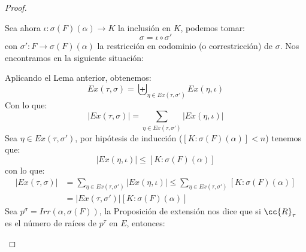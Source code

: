 \begin{prop}
\begin{proof}
\begin{itemize}
                Sea ahora $\iota:\sigma(F)(\alpha)\to K$ la inclusión en $K$, podemos tomar:
                \begin{equation*}
                    \sigma = \iota \circ \sigma'
                \end{equation*}
                con $\sigma':F\to \sigma(F)(\alpha)$ la restricción en codominio (o correstricción) de $\sigma$. Nos encontramos en la siguiente situación:
                \begin{figure}[H]
                    \centering
                \end{figure}
                \noindent
                Aplicando el Lema anterior, obtenemos:
                \begin{equation*}
                    Ex(\tau,\sigma) = \biguplus_{\eta \in Ex(\tau,\sigma')}Ex(\eta, \iota)
                \end{equation*}
                Con lo que:
                \begin{equation*}
                    |Ex(\tau,\sigma)| = \sum_{\eta \in  Ex(\tau, \sigma')}|Ex(\eta,\iota)|
                \end{equation*}
                Sea $\eta\in Ex(\tau,\sigma')$, por hipótesis de inducción ($[K:\sigma(F)(\alpha)]<n$) tenemos que:
                \begin{equation*}
                    |Ex(\eta,\iota)| \leq [K:\sigma(F)(\alpha)]
                \end{equation*}
                con lo que:
                \begin{align*}
                    |Ex(\tau,\sigma)| &= \sum_{\eta\in Ex(\tau,\sigma')}|Ex(\eta,\iota)| \leq \sum_{\eta\in Ex(\tau,\sigma')}[K:\sigma(F)(\alpha)] \\
                                      &= |Ex(\tau,\sigma')|[K:\sigma(F)(\alpha)]
                \end{align*}
                Sea $p^\sigma = Irr(\alpha,\sigma(F))$, la Proposición de extensión nos dice que si $\cc{R}_\tau$ es el número de raíces de $p^\tau$ en $E$, entonces:
                \begin{equation*}

\end{equation*}
\end{itemize}
\end{proof}
\end{prop}
